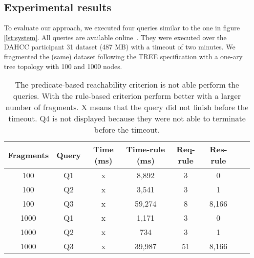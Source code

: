 \subsection{Experimental results}

To evaluate our approach, we executed four queries similar to the one in figure \ref{lst:system}.
All queries are available online~.
They were executed over the DAHCC participant 31 dataset (487 MB) with a timeout of two minutes.
We fragmented the (same) dataset following the TREE specification with a one-ary tree topology with 100 and 1000 nodes.


\begin{table}[ht]
    \centering
    \begin{tabular}{|c|c|c|c|c|c|c|c|}
        \hline
        \textbf{Fragments} & \textbf{Query} & \textbf{Time (ms)}  & \textbf{Time-rule (ms)} & \textbf{Req-rule} & \textbf{Res-rule} \\
        \hline
        100 & Q1 & x & 8,892& 3 & 0 \\
        100 & Q2 & x & 3,541& 3 & 1 \\
        100 & Q3 & x & 59,274& 8 & 8,166 \\
        \hhline{|=|=|=|=|=|=|=|=|}
        1000 & Q1 & x & 1,171& 3 & 0 \\
        1000 & Q2 & x & 734& 3 & 1 \\
        1000 & Q3 & x & 39,987& 51 & 8,166 \\
        \hline
    \end{tabular}
    \caption{
    The predicate-based reachability criterion is not able perform the queries. 
    With the  rule-based criterion perform better with a larger number of fragments.
    X means that the query did not finish before the timeout.
    Q4 is not displayed because they were not able to terminate before the timeout.}
    \label{tab:result}
\end{table}

